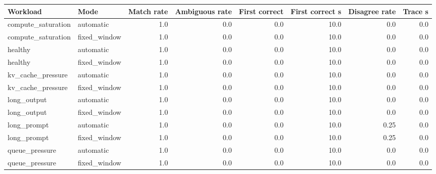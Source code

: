\begin{tabular}{llrrrrrr}
\hline
Workload & Mode & Match rate & Ambiguous rate & First correct & First correct s & Disagree rate & Trace s \\
\hline
compute_saturation & automatic & 1.0 & 0.0 & 0.0 & 10.0 & 0.0 & 0.0 \\
compute_saturation & fixed_window & 1.0 & 0.0 & 0.0 & 10.0 & 0.0 & 0.0 \\
healthy & automatic & 1.0 & 0.0 & 0.0 & 10.0 & 0.0 & 0.0 \\
healthy & fixed_window & 1.0 & 0.0 & 0.0 & 10.0 & 0.0 & 0.0 \\
kv_cache_pressure & automatic & 1.0 & 0.0 & 0.0 & 10.0 & 0.0 & 0.0 \\
kv_cache_pressure & fixed_window & 1.0 & 0.0 & 0.0 & 10.0 & 0.0 & 0.0 \\
long_output & automatic & 1.0 & 0.0 & 0.0 & 10.0 & 0.0 & 0.0 \\
long_output & fixed_window & 1.0 & 0.0 & 0.0 & 10.0 & 0.0 & 0.0 \\
long_prompt & automatic & 1.0 & 0.0 & 0.0 & 10.0 & 0.25 & 0.0 \\
long_prompt & fixed_window & 1.0 & 0.0 & 0.0 & 10.0 & 0.25 & 0.0 \\
queue_pressure & automatic & 1.0 & 0.0 & 0.0 & 10.0 & 0.0 & 0.0 \\
queue_pressure & fixed_window & 1.0 & 0.0 & 0.0 & 10.0 & 0.0 & 0.0 \\
\hline
\end{tabular}
